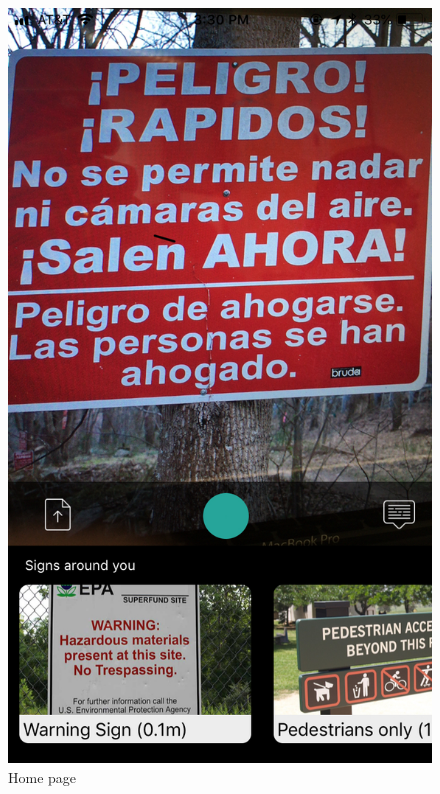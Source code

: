 \documentclass[12pt]{article}
\begin{document}
 \begin{figure} [H]
\centering
\begin{minipage}{.5\textwidth}
  \centering
  \includegraphics[width=0.9\linewidth]{media/1.jpg}
  \caption{Home page}
  \label{fig:landing}
\end{minipage}%
\begin{minipage}{.5\textwidth}
  \centering

\end{minipage}
\end{figure}
\end{document}
